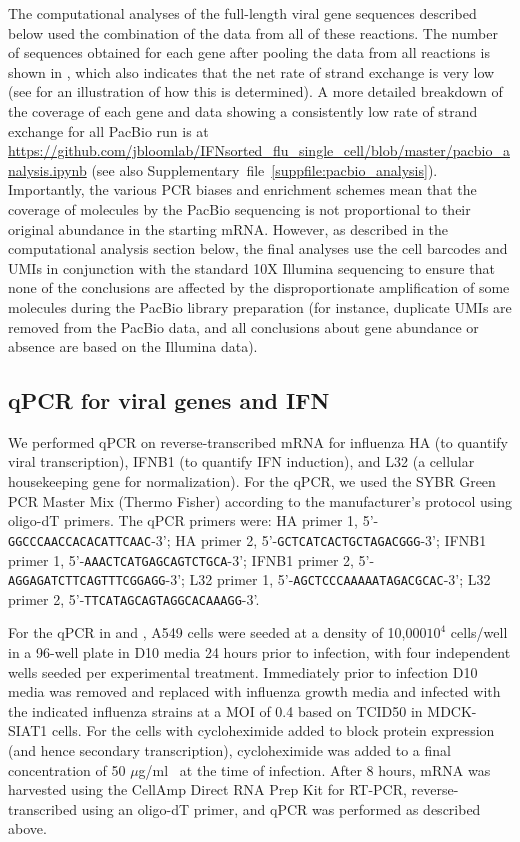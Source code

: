 \documentclass[9pt,lineno]{elife}
\begin{document}
The computational analyses of the full-length viral gene sequences described below used the combination of the data from all of these reactions.
The number of sequences obtained for each gene after pooling the data from all reactions is shown in , which also indicates that the net rate of strand exchange is very low (see  for an illustration of how this is determined).
A more detailed breakdown of the coverage of each gene and data showing a consistently low rate of strand exchange for all PacBio run is at \url{https://github.com/jbloomlab/IFNsorted_flu_single_cell/blob/master/pacbio_analysis.ipynb} (see also Supplementary~file~\ref{suppfile:pacbio_analysis}).
Importantly, the various PCR biases and enrichment schemes mean that the coverage of molecules by the PacBio sequencing is not proportional to their original abundance in the starting mRNA.
However, as described in the computational analysis section below, the final analyses use the cell barcodes and UMIs in conjunction with the standard 10X Illumina sequencing to ensure that none of the conclusions are affected by the disproportionate amplification of some molecules during the PacBio library preparation (for instance, duplicate UMIs are removed from the PacBio data, and all conclusions about gene abundance or absence are based on the Illumina data).

\subsection{qPCR for viral genes and IFN}
We performed qPCR on reverse-transcribed mRNA for influenza HA (to quantify viral transcription), IFNB1 (to quantify IFN induction), and L32 (a cellular housekeeping gene for normalization).
For the qPCR, we used the SYBR Green PCR Master Mix (Thermo Fisher) according to the manufacturer's protocol using oligo-dT primers.
The qPCR primers were: HA primer 1, 5'-\texttt{GGCCCAACCACACATTCAAC}-3'; HA primer 2, 5'-\texttt{GCTCATCACTGCTAGACGGG}-3'; IFNB1 primer 1, 5'-\texttt{AAACTCATGAGCAGTCTGCA}-3'; IFNB1 primer 2, 5'-\texttt{AGGAGATCTTCAGTTTCGGAGG}-3'; L32 primer 1, 5'-\texttt{AGCTCCCAAAAATAGACGCAC}-3'; L32 primer 2, 5'-\texttt{TTCATAGCAGTAGGCACAAAGG}-3'. 

For the qPCR in  and , A549 cells were seeded at a density of 10,000$10^4$ cells/well in a 96-well plate in D10 media 24 hours prior to infection, with four independent wells seeded per experimental treatment. 
Immediately prior to infection D10 media was removed and replaced with influenza growth media and infected with the indicated influenza strains at a MOI of 0.4 based on TCID50 in MDCK-SIAT1 cells.
For the cells with cycloheximide added to block protein expression (and hence secondary transcription), cycloheximide was added to a final concentration of 50 $\mu$g/ml~\citep[a concentration sufficient to block secondary transcription;][]{killip2014activation} at the time of infection.
After 8 hours, mRNA was harvested using the CellAmp Direct RNA Prep Kit for RT-PCR, reverse-transcribed using an oligo-dT primer, and qPCR was performed as described above.
\end{document}
